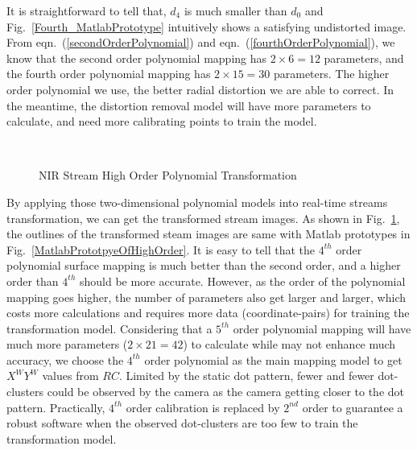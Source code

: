 %
%
It is straightforward to tell that, \(d_4\) is much smaller than \(d_0\) and Fig.~\ref{Fourth_MatlabPrototype} intuitively shows a satisfying undistorted image. From eqn.~(\ref{secondOrderPolynomial}) and eqn.~(\ref{fourthOrderPolynomial}), we know that the second order polynomial mapping has $2\times6=12$ parameters, and the fourth order polynomial mapping has $2\times15=30$ parameters. The higher order polynomial we use, the better radial distortion we are able to correct. In the meantime, the distortion removal model will have more parameters to calculate, and need more calibrating points to train the model.%
%
\\\indent
\begin{figure}[!t]
\centering
\hspace*{-0.3cm}
%
%
\\%
\hspace*{-0.3cm}
%
%
\caption{\gls{NIR} Stream High Order Polynomial Transformation}
\label{HighOrderNearIRRectification}
\end{figure}%
%
By applying those two-dimensional polynomial models into real-time streams transformation, we can get the transformed stream images. As shown in Fig.~\ref{HighOrderNearIRRectification}, the outlines of the transformed steam images are same with Matlab prototypes in Fig.~\ref{MatlabPrototpyeOfHighOrder}. It is easy to tell that the \(4^{th}\) order polynomial surface mapping is much better than the second order, and a higher order than \(4^{th}\) should be more accurate. However, as the order of the polynomial mapping goes higher, the number of parameters also get larger and larger, which costs more calculations and requires more data (coordinate-pairs) for training the transformation model. Considering that a \(5^{th}\) order polynomial mapping will have much more  parameters ($2\times21=42$) to calculate while may not enhance much accuracy, we choose the \(4^{th}\) order polynomial as the main mapping model to get \(X^WY^W\) values from \(RC\). Limited by the static dot pattern, fewer and fewer dot-clusters could be observed by the camera as the camera getting closer to the dot pattern. Practically, \(4^{th}\) order calibration is replaced by \(2^{nd}\) order to guarantee a robust software when the observed dot-clusters are too few to train the transformation model.
